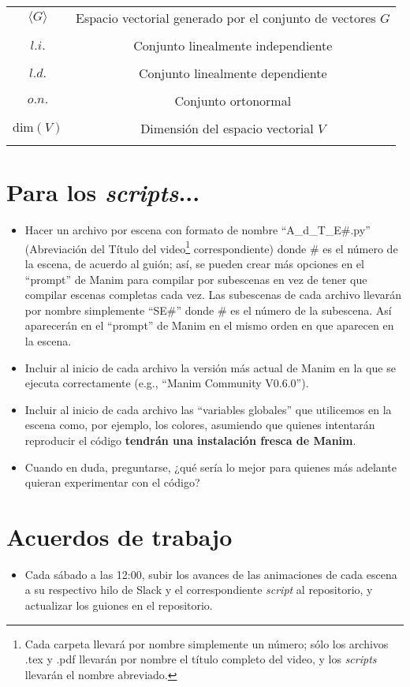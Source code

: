 \documentclass[12pt,dvipsnames]{article}
\numberwithin{equation}{section}
\begin{document}
\begin{tcolorbox}
\begin{tabular}{cc}
    $\langle G \rangle$ & Espacio vectorial generado por el conjunto de vectores $G$ \\ \\
    $l.i.$ & Conjunto linealmente independiente \\ \\
    $l.d.$ & Conjunto linealmente dependiente \\ \\
    $o.n.$ & Conjunto ortonormal \\ \\
    $\text{dim}(V)$ & Dimensión del espacio vectorial $V$ \\ \\

\end{tabular}
\end{tcolorbox}

\section{Para los \emph{scripts}...}

\begin{itemize}
    \item Hacer un archivo por escena con formato de nombre ``A\_d\_T\_E\#.py'' (Abreviación del Título del video\footnote{Cada carpeta llevará por nombre simplemente un número; sólo los archivos .tex y .pdf llevarán por nombre el título completo del video, y los \emph{scripts} llevarán el nombre abreviado.} correspondiente) donde \# es el número de la escena, de acuerdo al guión; así, se pueden crear más opciones en el ``prompt'' de Manim para compilar por subescenas en vez de tener que compilar escenas completas cada vez. Las subescenas de cada archivo llevarán por nombre simplemente ``SE\#'' donde \# es el número de la subescena. Así aparecerán en el ``prompt'' de Manim en el mismo orden en que aparecen en la escena.

    \item Incluir al inicio de cada archivo la versión más actual de Manim en la que se ejecuta correctamente (e.g., ``Manim Community V0.6.0'').
    
    \item Incluir al inicio de cada archivo las ``variables globales'' que utilicemos en la escena como, por ejemplo, los colores, asumiendo que quienes intentarán reproducir el código \textbf{tendrán una instalación fresca de Manim}.
    
    \item Cuando en duda, preguntarse, ¿qué sería lo mejor para quienes más adelante quieran experimentar con el código?
    
\end{itemize}

\section{Acuerdos de trabajo}

\begin{itemize}
    \item Cada sábado a las 12:00, subir los avances de las animaciones de cada escena a su respectivo hilo de Slack y el correspondiente \emph{script} al repositorio, y actualizar los guiones en el repositorio.
\end{itemize}
\end{document}
